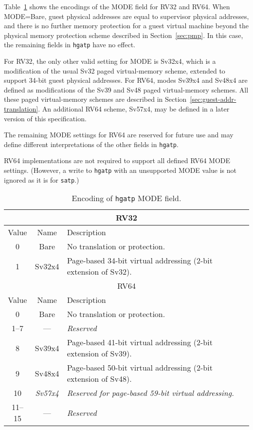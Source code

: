 Table~\ref{tab:hgatp-mode} shows the encodings of the MODE field for RV32 and
RV64.
When MODE=Bare, guest physical addresses are equal to supervisor physical
addresses, and there is no further memory protection for a guest virtual
machine beyond the physical memory protection scheme described in
Section~\ref{sec:pmp}.
In this case, the remaining fields in {\tt hgatp} have no effect.

For RV32, the only other valid setting for MODE is Sv32x4, which is a
modification of the usual Sv32 paged virtual-memory scheme, extended to support
34-bit guest physical addresses.
For RV64, modes Sv39x4 and Sv48x4 are defined as modifications of the Sv39 and
Sv48 paged virtual-memory schemes.
All these paged virtual-memory schemes are described in
Section~\ref{sec:guest-addr-translation}.
An additional RV64 scheme, Sv57x4, may be defined in a later version of this
specification.

The remaining MODE settings for RV64 are reserved for future use and may define
different interpretations of the other fields in {\tt hgatp}.

RV64 implementations are not required to support all defined RV64 MODE
settings.
(However, a write to {\tt hgatp} with an unsupported MODE value is not ignored
as it is for {\tt satp}.)

\begin{table}[h]
\begin{center}
\begin{tabular}{|c|c|l|}
\hline
\multicolumn{3}{|c|}{RV32} \\
\hline
Value  & Name & Description \\
\hline
0      & Bare   & No translation or protection. \\
1      & Sv32x4 & Page-based 34-bit virtual addressing (2-bit extension of Sv32). \\
\hline \hline
\multicolumn{3}{|c|}{RV64} \\
\hline
Value  & Name & Description \\
\hline
0      & Bare   & No translation or protection. \\
1--7   & ---    & {\em Reserved} \\
8      & Sv39x4 & Page-based 41-bit virtual addressing (2-bit extension of Sv39). \\
9      & Sv48x4 & Page-based 50-bit virtual addressing (2-bit extension of Sv48). \\
10     & {\em Sv57x4} & {\em Reserved for page-based 59-bit virtual addressing.} \\
11--15 & ---    & {\em Reserved} \\
\hline
\end{tabular}
\end{center}
\caption{Encoding of {\tt hgatp} MODE field.}
\label{tab:hgatp-mode}
\end{table}

